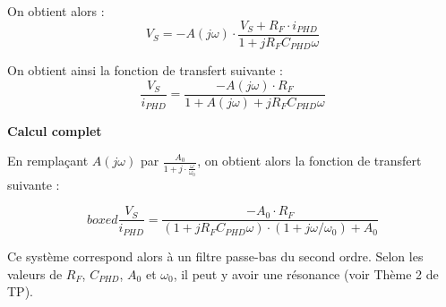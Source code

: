 \documentclass[a4paper,french]{paper}
\begin{document}
On obtient alors : $$V_S = - A(j\omega) \cdot \frac{V_S + R_F \cdot i_{PHD}}{1 + j R_F C_{PHD} \omega}$$

On obtient ainsi la fonction de transfert suivante : 
$$\boxed{\frac{V_S}{i_{PHD}} = \frac{- A(j\omega) \cdot R_F}{1 + A(j\omega) + j R_F C_{PHD} \omega}}$$

\textbf{Calcul complet}

En remplaçant $A(j\omega)$ par $\frac{A_0}{1 + j \cdot \frac{\omega}{\omega_0}}$, on obtient alors la fonction de transfert suivante :

$$boxed{\frac{V_S}{i_{PHD}} = \frac{- A_0 \cdot R_F}{(1 + j R_F C_{PHD} \omega) \cdot (1 + j \omega/\omega_0) + A_0}}$$

Ce système correspond alors à un filtre passe-bas du second ordre. Selon les valeurs de $R_F$, $C_{PHD}$, $A_0$ et $\omega_0$, il peut y avoir une résonance (voir Thème 2 de TP).




\end{document}
